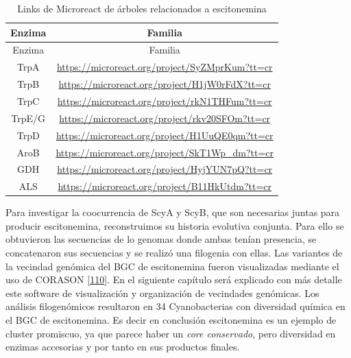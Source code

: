 \documentclass[12pt,twoside]{reedthesis}
\begin{document}
  \begin{longtable}[]{@{}cc@{}}
  \caption{Links de Microreact de árboles relacionados a escitonemina
  \label{tab:Microreact}}\tabularnewline
  \toprule
  Enzima & Familia\tabularnewline
  \midrule
  \endfirsthead
  \toprule
  Enzima & Familia\tabularnewline
  \midrule
  \endhead
  TrpA &
  \url{https://microreact.org/project/SyZMprKum?tt=cr}\tabularnewline
  TrpB &
  \url{https://microreact.org/project/H1jW0rFdX?tt=cr}\tabularnewline
  TrpC &
  \url{https://microreact.org/project/rkN1THFum?tt=cr}\tabularnewline
  TrpE/G &
  \url{https://microreact.org/project/rkv20SFOm?tt=cr}\tabularnewline
  TrpD &
  \url{https://microreact.org/project/H1UuQE0qm?tt=cr}\tabularnewline
  AroB &
  \url{https://microreact.org/project/SkT1Wp_dm?tt=cr}\tabularnewline
  GDH &
  \url{https://microreact.org/project/HyjYUN7pQ?tt=cr}\tabularnewline
  ALS &
  \url{https://microreact.org/project/B11HkUtdm?tt=cr}\tabularnewline
  \bottomrule
  \end{longtable}
  
  Para investigar la coocurrencia de ScyA y ScyB, que son necesarias
  juntas para producir escitonemina, reconstruimos su historia evolutiva
  conjunta. Para ello se obtuvieron las secuencias de lo genomas donde
  ambas tenían presencia, se concatenaron sus secuencias y se realizó una
  filogenia con ellas. Las variantes de la vecindad genómica del BGC de
  escitonemina fueron visualizadas mediante el uso de CORASON
  {[}\protect\hyperlink{ref-navarro-munoz_computational_2018}{110}{]}. En
  el siguiente capítulo será explicado con más detalle este software de
  visualización y organización de vecindades genómicas. Los análisis
  filogenómicos resultaron en 34 Cyanobacterias con diversidad química en
  el BGC de escitonemina. Es decir en conclusión escitonemina es un
  ejemplo de cluster promiscuo, ya que parece haber un \emph{core
  conservado}, pero diversidad en enzimas accesorias y por tanto en sus
  productos finales.
  
\end{document}
